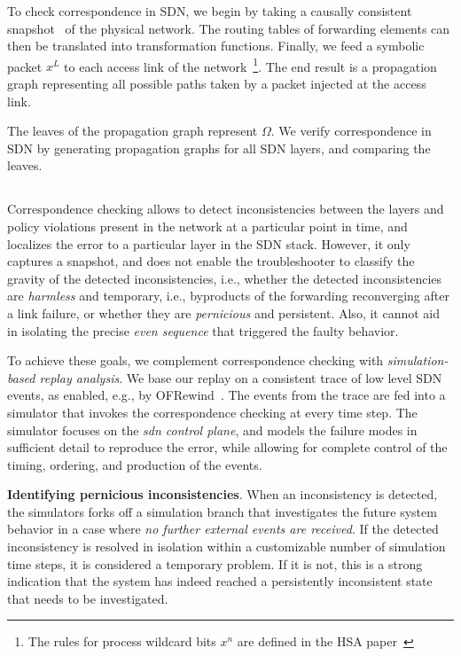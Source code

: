 To check correspondence in SDN, we begin by taking a causally consistent
snapshot~\cite{Chandy:1985:DSD:214451.214456} of the physical network. The routing
tables of forwarding elements can then be translated into transformation functions.
Finally, we feed a symbolic packet $x^L$ to each access link of the
network~\footnote{The rules for process wildcard bits $x^n$ are defined in
the HSA paper~\cite{hsa}}. The end result is a propagation graph representing all possible paths taken by a packet injected
at the access link.

The leaves of the propagation graph represent $\Omega$. We
verify correspondence in SDN by generating propagation graphs for all SDN layers,
and comparing the leaves.

\subsection{\SIMULATOR{}}

Correspondence checking allows to detect inconsistencies between the layers and
policy violations present in the network at a particular point in time, and
localizes the error to a particular layer in the SDN stack. However, it only
captures a snapshot, and does not enable the troubleshooter to classify the
gravity of the detected inconsistencies, i.e., whether the detected 
inconsistencies are \emph{harmless} and temporary, i.e., byproducts of the forwarding reconverging 
after a link failure, or whether they are \emph{pernicious} and persistent.
Also, it cannot aid in isolating the precise \emph{even sequence} that triggered
the faulty behavior.

To achieve these goals, we complement correspondence checking with
\emph{simulation-based replay analysis}. We base our replay on a consistent
trace of low level SDN events, as enabled, e.g., by OFRewind~\cite{ofrewind}. The
events from the trace are fed into a simulator that invokes the correspondence
checking at every time step. The simulator focuses on the \emph{sdn control plane},
and models the failure modes in sufficient detail to reproduce the error, while
allowing for complete control of the timing, ordering, and production of the events.

\textbf{Identifying pernicious inconsistencies}. When an inconsistency is detected,
the simulators forks off a simulation branch that investigates the future system behavior
in a case where \emph{no further external events are received}. If the detected inconsistency
is resolved in isolation within a customizable number of simulation time steps, it is considered
a temporary problem. If it is not, this is a strong indication that the system has indeed
reached a persistently inconsistent state that needs to be investigated.


